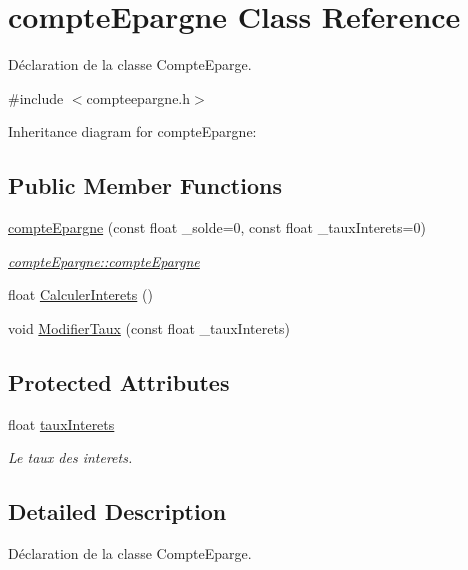 \hypertarget{classcompte_epargne}{}\section{compte\+Epargne Class Reference}
\label{classcompte_epargne}


Déclaration de la classe Compte\+Eparge.  




{\ttfamily \#include $<$compteepargne.\+h$>$}



Inheritance diagram for compte\+Epargne\+:
\subsection*{Public Member Functions}
\begin{DoxyCompactItemize}
\item 
\hyperlink{classcompte_epargne_aedb6ee7a479ebb8c3810e0694797546d}{compte\+Epargne} (const float \+\_\+solde=0, const float \+\_\+taux\+Interets=0)
\begin{DoxyCompactList}\small\item\em \hyperlink{classcompte_epargne_aedb6ee7a479ebb8c3810e0694797546d}{compte\+Epargne\+::compte\+Epargne} \end{DoxyCompactList}\item 
float \hyperlink{classcompte_epargne_a1737ef49ba1ad55b8e9eebc3c2ae89ac}{Calculer\+Interets} ()
\item 
void \hyperlink{classcompte_epargne_ab25d2e0166cb198065edb876840465a7}{Modifier\+Taux} (const float \+\_\+taux\+Interets)
\end{DoxyCompactItemize}
\subsection*{Protected Attributes}
\begin{DoxyCompactItemize}
\item 
float \hyperlink{classcompte_epargne_a12c7684e827cd393104d36ed09161df3}{taux\+Interets}
\begin{DoxyCompactList}\small\item\em Le taux des interets. \end{DoxyCompactList}\end{DoxyCompactItemize}


\subsection{Detailed Description}
Déclaration de la classe Compte\+Eparge. 

